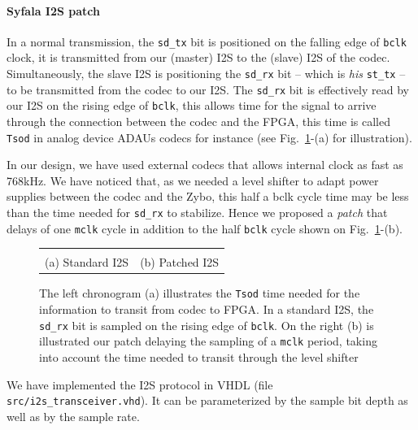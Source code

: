 \documentclass[11pt]{article}
\numberwithin{equation}{section}
\numberwithin{figure}{section}
\begin{document}
\paragraph{Syfala I2S patch} In a normal transmission, the {\tt sd\_tx} bit is positioned on the falling edge of {\tt bclk} clock, it is transmitted from our (master) I2S to the (slave) I2S of the codec. Simultaneously, the slave I2S is positioning the {\tt sd\_rx} bit -- which is {\em his} {\tt st\_tx} -- to be transmitted from the codec to our I2S. The {\tt sd\_rx} bit is effectively read by our I2S on the rising edge of {\tt bclk}, this allows time for the signal to arrive through the connection between the codec and the FPGA, this time is called {\tt Tsod} in analog device ADAUs codecs for instance (see Fig.~\ref{figi2szoom2}-(a) for illustration).  

In our design, we have used external codecs that allows internal clock as fast as 768kHz. We have noticed that, as we needed a level shifter to adapt power supplies between the codec and the Zybo, this  half a bclk cycle time may be less than the time needed for {\tt sd\_rx} to stabilize. Hence we proposed a {\em patch} that delays of one  {\tt mclk} cycle in addition to the half {\tt bclk} cycle shown on Fig.~\ref{figi2szoom2}-(b).

\begin{figure}[ht]
  \begin{tabular}{cc}
    \begin{boxedminipage}{0.5\textwidth}
      
      \end{boxedminipage} &
    \begin{boxedminipage}{0.5\textwidth}
      
            \end{boxedminipage}\\
  (a) Standard I2S & (b) Patched I2S \\
  \end{tabular}
  \caption{The left chronogram (a) illustrates the {\tt Tsod} time needed for the information to transit from codec to FPGA. In a standard I2S, the {\tt sd\_rx} bit is sampled on the rising edge of {\tt bclk}. On the right (b) is illustrated our patch delaying the sampling of a {\tt mclk} period, taking into account the time needed to transit through the level shifter}
  \label{figi2szoom2}
\end{figure}

We have implemented the I2S protocol in VHDL (file {\tt src/i2s\_transceiver.vhd}). It can be parameterized by the  sample bit depth as well as by the sample rate.  
\end{document}
